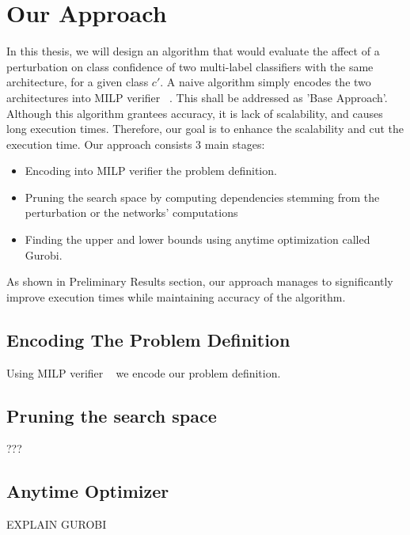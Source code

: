 
\section{Our Approach}

In this thesis, we will design an algorithm that would evaluate the affect of a perturbation on class confidence of two multi-label classifiers with the same architecture, for a given class $c'$. A naive algorithm simply encodes the two architectures into MILP verifier ~\cite{MIPVERIFY}. This shall be addressed as 'Base Approach'. Although this algorithm grantees accuracy, it is lack of scalability, and causes long execution times. Therefore, our goal is to enhance the scalability and cut the execution time. Our approach consists 3 main stages:
\begin{itemize}
    \item Encoding into MILP verifier the problem definition.
    \item Pruning the search space by computing dependencies stemming from the perturbation or the networks' computations
    \item Finding the upper and lower bounds using anytime optimization called Gurobi.
\end{itemize}
As shown in Preliminary Results section, our approach manages to significantly improve execution times while maintaining accuracy of the algorithm.

\subsection{Encoding The Problem Definition}
Using MILP verifier ~\cite{MIPVERIFY} we encode our problem definition. 

\subsection{Pruning the search space}
???

\subsection{Anytime Optimizer}
EXPLAIN GUROBI
